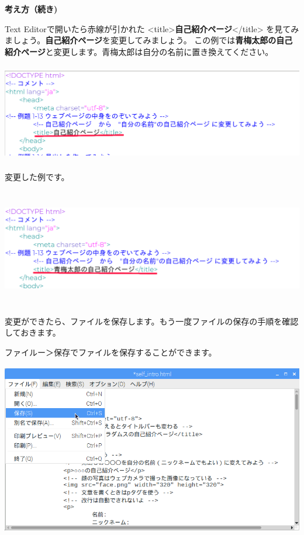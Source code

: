 \documentclass[a4paper,12pt]{jarticle}
\begin{document}
\clearpage
\textbf{考え方（続き)}

Text Editorで開いたら赤線が引かれた
{\textless}title{\textgreater}\textbf{自己紹介ページ}{\textless}/title{\textgreater}
を見てみましょう。\textbf{自己紹介ページ}を変更してみましょう。
この例では\textbf{青梅太郎の自己紹介ページ}と変更します。青梅太郎は自分の名前に置き換えてください。


\centering
\includegraphics[width=16.316cm,height=4.29cm]{textbook-img146.png}



\bigskip

\flushleft
変更した例です。

\centering
\includegraphics[width=16.198cm,height=5.145cm]{textbook-img148.png}


\bigskip

\flushleft
変更ができたら、ファイルを保存します。もう一度ファイルの保存の手順を確認しておきます。

ファイルー＞保存でファイルを保存することができます。



\centering
\includegraphics[width=13.624cm,height=7.512cm]{textbook-img147.png}
\end{document}
